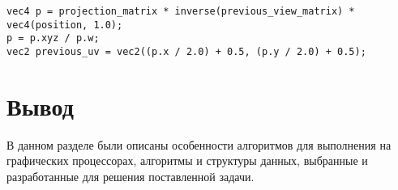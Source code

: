 \begin{lstlisting}[caption={Проецирование одного кадра на другой},label={lst:reproject},frame=single]
vec4 p = projection_matrix * inverse(previous_view_matrix) * vec4(position, 1.0);
p = p.xyz / p.w;
vec2 previous_uv = vec2((p.x / 2.0) + 0.5, (p.y / 2.0) + 0.5);
\end{lstlisting}

\section*{Вывод}

В данном разделе были описаны особенности алгоритмов для выполнения
на графических процессорах, алгоритмы и структуры данных, выбранные 
и разработанные для решения поставленной задачи. 
